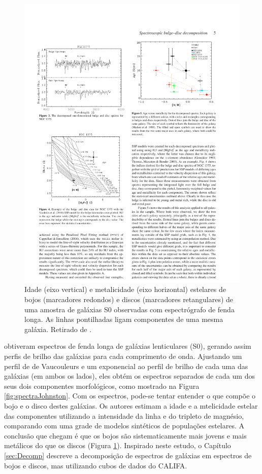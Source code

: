 \begin{figure}
	\includegraphics{figuras/johnston-pop}
	\caption[Idade e metalicidade de bojos e discos de galáxias S0.] {Idade (eixo
	vertical) e metalicidade (eixo horizontal) estelares de bojos (marcadores
	redondos) e discos (marcadores retangulares) de uma amostra de galáxias S0
	observadas com espectrógrafo de fenda longa. As linhas pontilhadas ligam
	componentes de uma mesma galáxia. Retirado de \citet{Johnston2012}.}
	\label{fig:populationJohnston}
\end{figure}

\citet{Johnston2012} obtiveram espectros de fenda longa de galáxias lenticulares
(S0), gerando assim perfis de brilho das galáxias para cada comprimento de onda.
Ajustando um perfil de de Vaucouleurs e um exponencial ao perfil de brilho de
cada uma das galáxias (em ambos os lados), eles obtém os espectros separados de
cada um dos seus dois componentes morfológicos, como mostrado na Figura
\ref{fig:spectraJohnston}. Com os espectros, pode-se tentar entender o que
compõe o bojo e o disco destes galáxias. Os autores estimam a idade e a
mtelicidade estelar das componentes utilizando a intensidade da linha \Hbeta e
do tripleto de magnésio, comparando com uma grade de modelos sintéticos de
populações estelares. A conclusão que chegam é que os bojos são sistematicamente
mais jovens e mais metálicos do que os discos (Figura
\ref{fig:populationJohnston}). Inspirado neste estudo, o Capítulo
\ref{sec:Decomp} descreve a decomposição de espectros de galáxias em espectros
de bojos e discos, mas utilizando cubos de dados do CALIFA.


